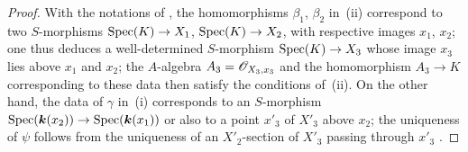 \begin{proof}
With the notations of , the homomorphisms $\beta_1$, $\beta_2$ in~(ii) correspond to two $S$-morphisms $\operatorname{Spec}(K)\to X_1$, $\operatorname{Spec}(K)\to X_2$, with respective images $x_1$, $x_2$;
one thus deduces a well-determined $S$-morphism $\operatorname{Spec}(K)\to X_3$  whose image $x_3$ lies above $x_1$ and $x_2$;
the $A$-algebra $A_3=\mathscr{O}_{X_3,x_3}$ and the homomorphism $A_3\to K$ corresponding to these data then satisfy the conditions of~(ii).
On the other hand, the data of $\gamma$ in~(i) corresponds to an $S$-morphism $\operatorname{Spec}(\boldsymbol{k}(x_2))\to\operatorname{Spec}(\boldsymbol{k}(x_1))$ or also to a point $x'_3$ of $X'_3$ above $x_2$;
the uniqueness of $\psi$ follows from the uniqueness of an $X'_2$-section of $X'_3$ passing through $x'_3$ .
\end{proof}

